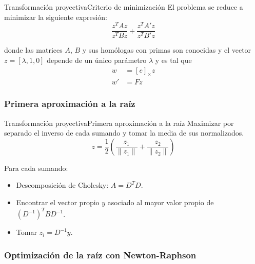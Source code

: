\documentclass[aspectratio=169,14pt,spanish]{beamer}
\begin{document}
      \begin{frame}{Transformación proyectiva}{Criterio de minimización}
          El problema se reduce a minimizar la siguiente expresión:
          \begin{equation}
              \frac{z^T Az}{z^T Bz} + \frac{z^T A'z}{z^T B'z}
              \label{eq_minz}
          \end{equation}

          donde las matrices $A$, $B$ y sus homólogas con primas son conocidas y el vector $z = [\lambda, 1, 0]$ depende de un único parámetro $\lambda$ y es tal que
          \begin{align*}
            w &= [e]_\times z\\
            w' &= Fz
          \end{align*}
      \end{frame}

      \subsubsection{Primera aproximación a la raíz}

        \begin{frame}{Transformación proyectiva}{Primera aproximación a la raíz}
            Maximizar por separado el inverso de cada sumando y tomar la media de sus normalizados.
            \[
            z = \frac{1}{2}\left(\frac{z_1}{\lVert z_1 \rVert} + \frac{z_2}{\lVert z_2 \rVert}\right)
            \]

            Para cada sumando:
            \begin{itemize}
                \item<2-> Descomposición de Cholesky: $A = D^T D$.
                \item<3-> Encontrar el vector propio $y$ asociado al mayor valor propio de $(D^{-1})^T B D^{-1}$.
                \item<4-> Tomar $z_i = D^{-1}y$.
            \end{itemize}
        \end{frame}
      \subsubsection{Optimización de la raíz con Newton-Raphson}
\end{document}
